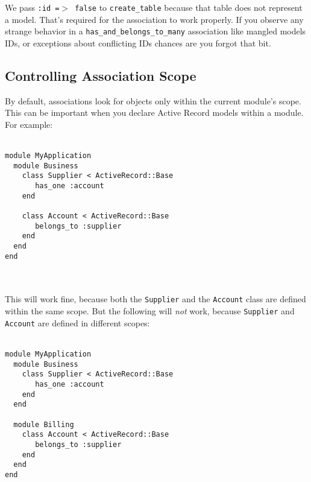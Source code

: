\documentclass[10pt]{book}
\begin{document}
We pass \texttt{:id =$>$ false} to \texttt{create\_table} because  that table does not represent a model. That’s required for the  association to work properly. If you observe any strange behavior in a \texttt{has\_and\_belongs\_to\_many} association like mangled models IDs, or exceptions about conflicting IDs chances are you forgot that bit.

\subsection{ Controlling Association Scope}

By default, associations look for objects only within the current  module’s scope. This can be important when you declare Active Record  models within a module. For example:
\\ \\
\begin{minipage}{\textwidth}{\scriptsize
\begin{verbatim}
module MyApplication
  module Business
    class Supplier < ActiveRecord::Base
       has_one :account
    end
 
    class Account < ActiveRecord::Base
       belongs_to :supplier
    end
  end
end
\end{verbatim}}
\end{minipage}
\\ \\

This will work fine, because both the \texttt{Supplier} and the \texttt{Account} class are defined within the same scope. But the following will \emph{not} work, because \texttt{Supplier} and \texttt{Account} are defined in different scopes:
\\ \\
\begin{minipage}{\textwidth}{\scriptsize
\begin{verbatim}
module MyApplication
  module Business
    class Supplier < ActiveRecord::Base
       has_one :account
    end
  end
 
  module Billing
    class Account < ActiveRecord::Base
       belongs_to :supplier
    end
  end
end
\end{verbatim}}
\end{minipage}
\\ \\
\end{document}
